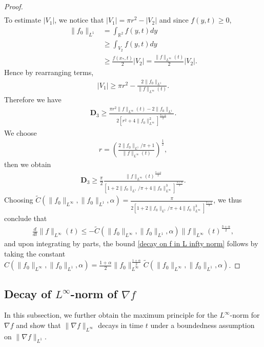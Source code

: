 \documentclass[reqno]{amsart}%
\theoremstyle{definition}
\theoremstyle{remark}
\numberwithin{equation}{section}
\newcommand{\0}{\mathbf{0}}
\newcommand{\1}{\mathbf{1}}
\newcommand{\R}{\mathbb R}
\numberwithin{equation}{section}
\numberwithin{theorem}{section}
\numberwithin{figure}{section}
\begin{document}
\begin{proof}
\begin{align*}
\end{align*}
To estimate $|V_1|$, we notice that $|V_1|=\pi r^2 - |V_2|$ and since $f(y,t)\ge0$,
\begin{align*}
\|f_0\|_{L^1}&=\int_{\R^2} f(y,t)dy\\
&\ge\int_{V_2}f(y,t)dy\\
&\ge\frac{f(x_*,t)}{2}|V_2|=\frac{\|f\|_{L^\infty}(t)}{2}|V_2|.
\end{align*}
Hence by rearranging terms,
\begin{align*}
|V_1|\ge\pi r^2 - \frac{2\|f_0\|_{L^1}}{\|f\|_{L^\infty}(t)}.
\end{align*}
Therefore we have 
\begin{align*}
\mathbf{D}_3\ge \frac{\pi r^2\|f\|_{L^\infty}(t) - 2\|f_0\|_{L^1}}{2[r^2+4\|f_0\|^2_{L^\infty}]^\frac{3+\alpha}{2}}.
\end{align*}
We choose 
\begin{align*}
r=\left(\frac{2\|f_0\|_{L^1}/\pi+1}{\|f\|_{L^\infty}(t)}\right)^\frac{1}{2},
\end{align*}
then we obtain
\begin{align*}
\mathbf{D}_3\ge\frac{\pi}{2}\frac{\|f\|_{L^\infty}(t)^\frac{3+\alpha}{2}}{[1+2\|f_0\|_{L^1}/\pi+4\|f_0\|^3_{L^\infty}]^\frac{3+\alpha}{2}}.
\end{align*}
Choosing $\tilde C(\|f_0\|_{L^\infty},\|f_0\|_{L^1},\alpha)=\frac{\pi}{2[1+2\|f_0\|_{L^1}/\pi+4\|f_0\|^3_{L^\infty}]^\frac{3+\alpha}{2}}$, we thus conclude that
\begin{align*}
\frac{d}{dt}\|f\|_{L^\infty}(t)\le - \tilde C(\|f_0\|_{L^\infty},\|f_0\|_{L^1},\alpha)\|f\|_{L^\infty}(t)^\frac{3+\alpha}{2},
\end{align*}
and upon integrating by parts, the bound \eqref{decay on f in L infty norm} follows by taking the constant $C(\|f_0\|_{L^\infty},\|f_0\|_{L^1},\alpha)=\frac{1+\alpha}{2}\|f_0\|_{L^\infty}^\frac{1+\alpha}{2}\tilde C(\|f_0\|_{L^\infty},\|f_0\|_{L^1},\alpha)$.
\end{proof}

\subsection{Decay of $L^\infty$-norm of $\nabla f$}

In this subsection, we further obtain the maximum principle for the $L^\infty$-norm for $\nabla f$ and show that $\|\nabla f\|_{L^\infty}$ decays in time $t$ under a boundedness assumption on $\|\nabla f\|_{L^1}$.
\end{document}
